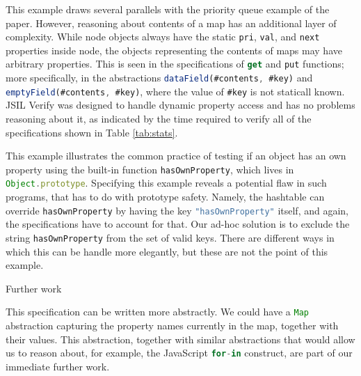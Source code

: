\documentclass{article}
\def\jsinline{\lstinline[language=JavaScript, basicstyle=\small]}
\begin{document}
This example draws several parallels with the priority queue example of the paper. However, reasoning about contents of a map has an additional layer of complexity. While node objects always have the static \jsinline|pri|, \jsinline|val|, and \jsinline|next| properties inside node,  the objects representing the contents of maps may have arbitrary properties. This is seen in the specifications of \jsinline|get| and \jsinline|put| functions; more specifically, in the abstractions \jsinline|dataField(#contents, #key)| and \jsinline|emptyField(#contents, #key)|, where the value of \jsinline|#key| is not staticall known. JSIL Verify was designed to handle dynamic property access and has no problems reasoning about it, as indicated by the time required to verify all of the specifications shown in Table \ref{tab:stats}.

This example illustrates the common practice of testing if an object has an own property using the built-in function \jsinline|hasOwnProperty|, which lives in \jsinline|Object.prototype|. Specifying this example reveals a potential flaw in such programs, that has to do with prototype safety. Namely, the hashtable can override \jsinline|hasOwnProperty| by having the key \jsinline|"hasOwnProperty"| itself, and again, the specifications have to account for that. Our ad-hoc solution is to exclude the string \jsinline|hasOwnProperty| from the set of valid keys. There are different ways in which this can be handle more elegantly, but these are not the point of this example.

\begin{display}{Further work}
\ \ \begin{minipage}{0.97\textwidth}
This specification can be written more abstractly. We could have a \jsinline|Map| abstraction capturing the property names currently in the map, together with their values. This abstraction, together with similar abstractions that would allow us to reason about, for example, the JavaScript \jsinline|for-in| construct, are part of our immediate further work.
\end{minipage}
\end{display}
\end{document}
